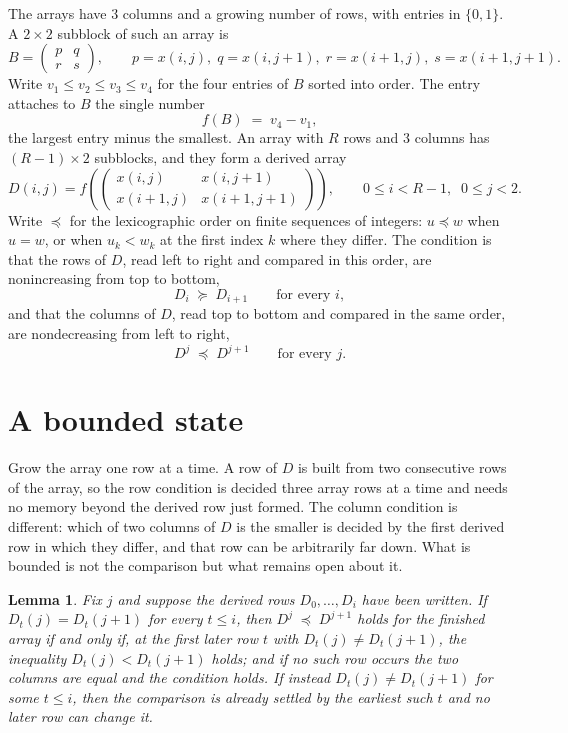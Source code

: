 \documentclass[11pt,a4paper]{article}
\theoremstyle{plain}
\newtheorem{lemma}[theorem]{Lemma}
\theoremstyle{definition}
\begin{document}
The arrays have $3$ columns and a growing number of rows, with entries in $\{0,1\}$. A
$2\times2$ subblock of such an array is
\[
B=\begin{pmatrix} p & q \\ r & s \end{pmatrix},
\qquad p=x(i,j),\; q=x(i,j+1),\; r=x(i+1,j),\; s=x(i+1,j+1).
\]
Write $v_1\le v_2\le v_3\le v_4$ for the four entries of $B$ sorted into order. The entry attaches to $B$ the single number
\[
f(B)\;=\;v_4-v_1,
\]
the largest entry minus the smallest. An array with $R$ rows and $3$ columns has $(R-1)\times2$ subblocks, and they
form a derived array
\[
D(i,j)=f\!\left(\begin{pmatrix} x(i,j) & x(i,j+1) \\ x(i+1,j) & x(i+1,j+1)\end{pmatrix}
\right),\qquad 0\le i<R-1,\;\; 0\le j<2 .
\]
Write $\preceq$ for the lexicographic order on finite sequences of integers: $u\preceq w$ when
$u=w$, or when $u_k<w_k$ at the first index $k$ where they differ. The condition is that the
rows of $D$, read left to right and compared in this order, are nonincreasing from top to bottom,
\[
D_{i}\;\succeq\;D_{i+1}\qquad\text{for every } i,
\]
and that the columns of $D$, read top to bottom and compared in the same order, are nondecreasing
from left to right,
\[
D^{j}\;\preceq\;D^{j+1}\qquad\text{for every } j .
\]

\section{A bounded state}

Grow the array one row at a time. A row of $D$ is built from two consecutive rows of the array,
so the row condition is decided three array rows at a time and needs no memory beyond the
derived row just formed. The column condition is different: which of two columns of $D$ is the
smaller is decided by the first derived row in which they differ, and that row can be
arbitrarily far down. What is bounded is not the comparison but what remains open about it.

\begin{lemma}\label{lem:bits}
Fix $j$ and suppose the derived rows $D_0,\dots,D_i$ have been written. If $D_t(j)=D_t(j+1)$ for
every $t\le i$, then $D^{j}\;\preceq\;D^{j+1}$ holds for the finished array if and only if,
at the first later row $t$ with $D_t(j)\neq D_t(j+1)$, the inequality $D_t(j)<D_t(j+1)$
holds; and if no such row occurs the two columns are equal and the condition holds. If instead
$D_t(j)\neq D_t(j+1)$ for some $t\le i$, then the comparison is already settled by the earliest
such $t$ and no later row can change it.
\end{lemma}
\end{document}
